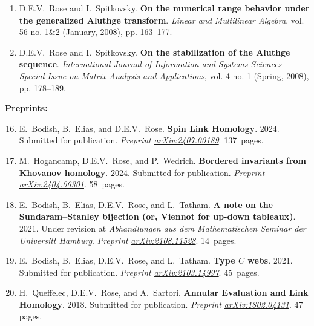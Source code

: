 \documentclass[10pt]{article}
\begin{document}
\begin{enumerate}
\item
D.E.V.~Rose and I.~Spitkovsky.
{\bf On the numerical range behavior under the generalized Aluthge transform}.
\emph{Linear and Multilinear Algebra}, vol. 56 no. 1\&2 (January, 2008), pp. 163--177. %
 
\item 
D.E.V.~Rose and I.~Spitkovsky.
{\bf On the stabilization of the Aluthge sequence}.
\emph{International Journal of Information and Systems Sciences - 
Special Issue on Matrix Analysis and Applications}, 
vol. 4 no. 1 (Spring, 2008), pp. 178--189. %
\end{enumerate}

\noindent\textbf{Preprints:}

\begin{enumerate}
\setcounter{enumi}{15}

\item
E.~Bodish, B.~Elias, and D.E.V.~Rose.
{\bf Spin Link Homology}.
2024.
Submitted for publication.
\emph{Preprint}
\href{http://arxiv.org/abs/2407.00189}{\emph{arXiv:2407.00189}}.
137~pages.

\item
M.~Hogancamp, D.E.V.~Rose, and P.~Wedrich.
{\bf Bordered invariants from Khovanov homology}.
2024.
Submitted for publication.
\emph{Preprint}
\href{http://arxiv.org/abs/2404.06301}{\emph{arXiv:2404.06301}}.
58~pages.

\item
E.~Bodish\textsuperscript{\textdagger}, B.~Elias, D.E.V.~Rose, and L.~Tatham.
{\bf A note on the Sundaram--Stanley bijection (or, Viennot for up-down tableaux)}.
2021.
Under revision at \emph{Abhandlungen aus dem Mathematischen Seminar der Universitt Hamburg}.
\emph{Preprint} 
\href{http://arxiv.org/abs/2108.11528}{\emph{arXiv:2108.11528}}.
14~pages.

\item 
E.~Bodish\textsuperscript{\textdagger}, B.~Elias, D.E.V.~Rose, and L.~Tatham\textsuperscript{\textdagger}.
{\bf Type $C$ webs}.
2021.
Submitted for publication.
\emph{Preprint}
\href{http://arxiv.org/abs/2103.14997}{\emph{arXiv:2103.14997}}.
45~pages.

\item 
H.~Queffelec, D.E.V.~Rose, and A.~Sartori.
{\bf Annular Evaluation and Link Homology}.
2018.
Submitted for publication.
\emph{Preprint}
\href{http://arxiv.org/abs/1802.04131}{\emph{arXiv:1802.04131}}.
47 pages.

\end{enumerate}
\end{document}
